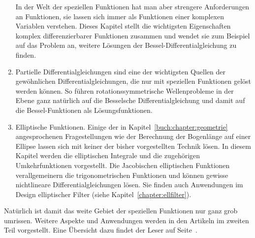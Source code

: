\begin{enumerate}
In der Welt der speziellen Funktionen hat man aber strengere
Anforderungen an Funktionen, sie lassen sich immer als Funktionen
einer komplexen Variablen verstehen.
Dieses Kapitel stellt die wichtigsten Eigenschaften komplex
differenzierbarer Funktionen zusammen und wendet sie zum Beispiel
auf das Problem an, weitere Lösungen der Bessel-Differentialgleichung
zu finden.
\item
Partielle Differentialgleichungen sind eine der wichtigsten Quellen
der gewöhnlichen Differentialgleichungen, die nur mit speziellen
Funktionen gelöst werden können.
So führen rotationssymmetrische Wellenprobleme in der Ebene
ganz natürlich auf die Besselsche Differentialgleichung und damit
auf die Bessel-Funktionen als Lösungsfunktionen.
\item
Elliptische Funktionen.
Einige der in Kapitel~\ref{buch:chapter:geometrie} angesprochenen
Fragestellungen wie der Berechnung der Bogenlänge auf einer Ellipse
lassen sich mit keiner der bisher vorgestellten Technik lösen.
In diesem Kapitel werden die elliptischen Integrale und die
zugehörigen Umkehrfunktionen vorgestellt.
Die Jacobischen elliptischen Funktionen verallgemeinern
die trigonometrischen Funktionen und können gewisse nichtlineare 
Differentialgleichungen lösen.
Sie finden auch Anwendungen im Design elliptischer Filter
(siehe Kapitel~\ref{chapter:ellfilter}).
\end{enumerate}

Natürlich ist damit das weite Gebiet der speziellen Funktionen
nur ganz grob umrissen.
Weitere Aspekte und Anwendungen werden in den Artikeln im zweiten
Teil vorgestellt.
Eine Übersicht dazu findet der Leser auf Seite~\pageref{buch:uebersicht}.

